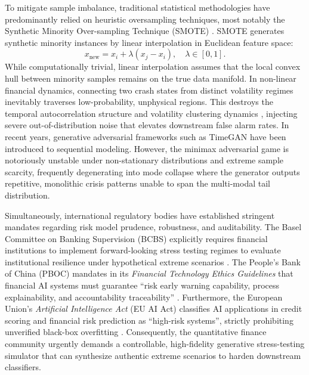 \documentclass[preprint,12pt,authoryear]{elsarticle}
\begin{document}
To mitigate sample imbalance, traditional statistical methodologies have predominantly relied on heuristic oversampling techniques, most notably the Synthetic Minority Over-sampling Technique (SMOTE) \citep{chawla2002smote}. SMOTE generates synthetic minority instances by linear interpolation in Euclidean feature space:
\begin{equation}
    x_{\text{new}} = x_i + \lambda (x_j - x_i), \quad \lambda \in [0, 1].
\end{equation}
While computationally trivial, linear interpolation assumes that the local convex hull between minority samples remains on the true data manifold. In non-linear financial dynamics, connecting two crash states from distinct volatility regimes inevitably traverses low-probability, unphysical regions. This destroys the temporal autocorrelation structure and volatility clustering dynamics \citep{cont2001empirical}, injecting severe out-of-distribution noise that elevates downstream false alarm rates. In recent years, generative adversarial frameworks such as TimeGAN \citep{yoon2019time} have been introduced to sequential modeling. However, the minimax adversarial game is notoriously unstable under non-stationary distributions and extreme sample scarcity, frequently degenerating into mode collapse where the generator outputs repetitive, monolithic crisis patterns unable to span the multi-modal tail distribution.

Simultaneously, international regulatory bodies have established stringent mandates regarding risk model prudence, robustness, and auditability. The Basel Committee on Banking Supervision (BCBS) explicitly requires financial institutions to implement forward-looking stress testing regimes to evaluate institutional resilience under hypothetical extreme scenarios \citep{bcbs2023stress}. The People's Bank of China (PBOC) mandates in its \textit{Financial Technology Ethics Guidelines} that financial AI systems must guarantee ``risk early warning capability, process explainability, and accountability traceability'' \citep{pboc2022ethics}. Furthermore, the European Union's \textit{Artificial Intelligence Act} (EU AI Act) classifies AI applications in credit scoring and financial risk prediction as ``high-risk systems'', strictly prohibiting unverified black-box overfitting \citep{eu2024ai}. Consequently, the quantitative finance community urgently demands a controllable, high-fidelity generative stress-testing simulator that can synthesize authentic extreme scenarios to harden downstream classifiers.
\end{document}
